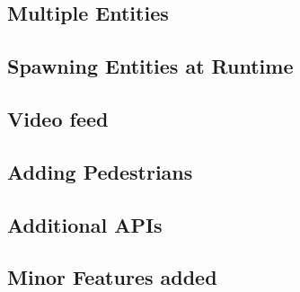 \subsection{Multiple Entities}

\subsection{Spawning Entities at Runtime}

\subsection{Video feed}

\subsection{Adding Pedestrians}

\subsection{Additional APIs}

\subsection{Minor Features added}